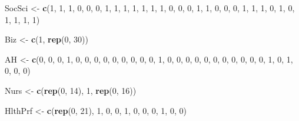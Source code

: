 \documentclass[]{tufte-handout}
\newenvironment{Shaded}{}{}
\newcommand{\KeywordTok}[1]{\textbf{{#1}}}
\newcommand{\DecValTok}[1]{{#1}}
\newcommand{\StringTok}[1]{{#1}}
\newcommand{\NormalTok}[1]{{#1}}
\begin{document}
\begin{Shaded}
\begin{Highlighting}[]
\NormalTok{SocSci <-}\StringTok{ }\KeywordTok{c}\NormalTok{(}\DecValTok{1}\NormalTok{, }\DecValTok{1}\NormalTok{, }\DecValTok{1}\NormalTok{, }\DecValTok{0}\NormalTok{, }\DecValTok{0}\NormalTok{, }\DecValTok{0}\NormalTok{, }\DecValTok{1}\NormalTok{, }\DecValTok{1}\NormalTok{, }\DecValTok{1}\NormalTok{, }\DecValTok{1}\NormalTok{, }\DecValTok{1}\NormalTok{, }\DecValTok{1}\NormalTok{, }\DecValTok{1}\NormalTok{, }\DecValTok{0}\NormalTok{, }\DecValTok{0}\NormalTok{, }\DecValTok{0}\NormalTok{, }\DecValTok{1}\NormalTok{, }\DecValTok{1}\NormalTok{, }\DecValTok{0}\NormalTok{, }\DecValTok{0}\NormalTok{, }
    \DecValTok{0}\NormalTok{, }\DecValTok{1}\NormalTok{, }\DecValTok{1}\NormalTok{, }\DecValTok{1}\NormalTok{, }\DecValTok{0}\NormalTok{, }\DecValTok{1}\NormalTok{, }\DecValTok{0}\NormalTok{, }\DecValTok{1}\NormalTok{, }\DecValTok{1}\NormalTok{, }\DecValTok{1}\NormalTok{, }\DecValTok{1}\NormalTok{)}

\NormalTok{Biz <-}\StringTok{ }\KeywordTok{c}\NormalTok{(}\DecValTok{1}\NormalTok{, }\KeywordTok{rep}\NormalTok{(}\DecValTok{0}\NormalTok{, }\DecValTok{30}\NormalTok{))}

\NormalTok{AH <-}\StringTok{ }\KeywordTok{c}\NormalTok{(}\DecValTok{0}\NormalTok{, }\DecValTok{0}\NormalTok{, }\DecValTok{0}\NormalTok{, }\DecValTok{1}\NormalTok{, }\DecValTok{0}\NormalTok{, }\DecValTok{0}\NormalTok{, }\DecValTok{0}\NormalTok{, }\DecValTok{0}\NormalTok{, }\DecValTok{0}\NormalTok{, }\DecValTok{0}\NormalTok{, }\DecValTok{0}\NormalTok{, }\DecValTok{0}\NormalTok{, }\DecValTok{0}\NormalTok{, }\DecValTok{1}\NormalTok{, }\DecValTok{0}\NormalTok{, }\DecValTok{0}\NormalTok{, }\DecValTok{0}\NormalTok{, }\DecValTok{0}\NormalTok{, }\DecValTok{0}\NormalTok{, }\DecValTok{0}\NormalTok{, }\DecValTok{0}\NormalTok{, }
    \DecValTok{0}\NormalTok{, }\DecValTok{0}\NormalTok{, }\DecValTok{0}\NormalTok{, }\DecValTok{0}\NormalTok{, }\DecValTok{1}\NormalTok{, }\DecValTok{0}\NormalTok{, }\DecValTok{1}\NormalTok{, }\DecValTok{0}\NormalTok{, }\DecValTok{0}\NormalTok{, }\DecValTok{0}\NormalTok{)}

\NormalTok{Nurs <-}\StringTok{ }\KeywordTok{c}\NormalTok{(}\KeywordTok{rep}\NormalTok{(}\DecValTok{0}\NormalTok{, }\DecValTok{14}\NormalTok{), }\DecValTok{1}\NormalTok{, }\KeywordTok{rep}\NormalTok{(}\DecValTok{0}\NormalTok{, }\DecValTok{16}\NormalTok{))}

\NormalTok{HlthPrf <-}\StringTok{ }\KeywordTok{c}\NormalTok{(}\KeywordTok{rep}\NormalTok{(}\DecValTok{0}\NormalTok{, }\DecValTok{21}\NormalTok{), }\DecValTok{1}\NormalTok{, }\DecValTok{0}\NormalTok{, }\DecValTok{0}\NormalTok{, }\DecValTok{1}\NormalTok{, }\DecValTok{0}\NormalTok{, }\DecValTok{0}\NormalTok{, }\DecValTok{0}\NormalTok{, }\DecValTok{1}\NormalTok{, }\DecValTok{0}\NormalTok{, }\DecValTok{0}\NormalTok{)}


\end{Highlighting}
\end{Shaded}
\end{document}
